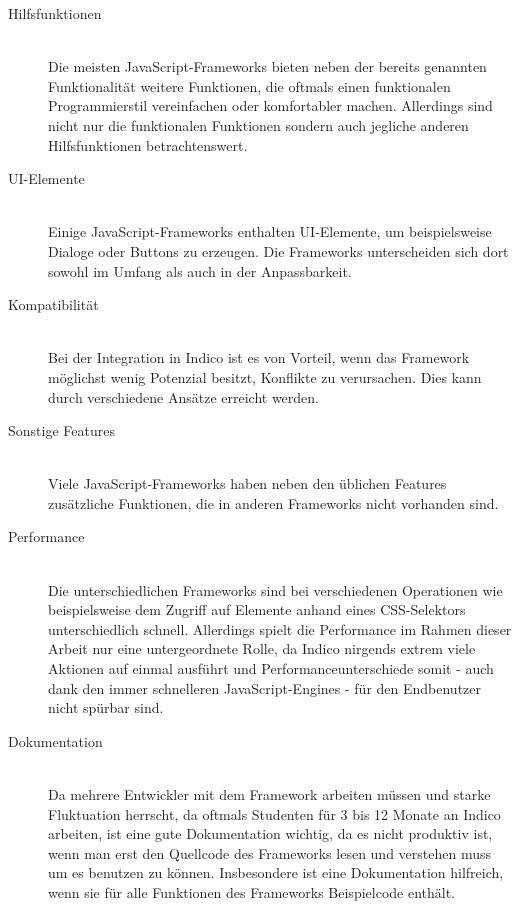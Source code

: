\begin{description}
\item[Hilfsfunktionen] \hfill \\
Die meisten JavaScript-Frameworks bieten neben der bereits genannten Funktionalität weitere
Funktionen, die oftmals einen funktionalen Programmierstil vereinfachen oder komfortabler machen.
Allerdings sind nicht nur die funktionalen Funktionen sondern auch jegliche anderen Hilfsfunktionen
betrachtenswert.

\item[UI-Elemente] \hfill \\
Einige JavaScript-Frameworks enthalten UI-Elemente, um beispielsweise Dialoge oder Buttons zu
erzeugen. Die Frameworks unterscheiden sich dort sowohl im Umfang als auch in der Anpassbarkeit.

\item[Kompatibilität] \hfill \\
Bei der Integration in Indico ist es von Vorteil, wenn das Framework möglichst wenig Potenzial
besitzt, Konflikte zu verursachen. Dies kann durch verschiedene Ansätze erreicht werden.

\item[Sonstige Features] \hfill \\
Viele JavaScript-Frameworks haben neben den üblichen Features zusätzliche Funktionen, die in anderen
Frameworks nicht vorhanden sind.

\item[Performance] \hfill \\
Die unterschiedlichen Frameworks sind bei verschiedenen Operationen wie beispielsweise dem Zugriff
auf Elemente anhand eines CSS-Selektors unterschiedlich schnell. Allerdings spielt die Performance
im Rahmen dieser Arbeit nur eine untergeordnete Rolle, da Indico nirgends extrem viele Aktionen auf
einmal ausführt und Performanceunterschiede somit - auch dank den immer schnelleren
JavaScript-Engines - für den Endbenutzer nicht spürbar sind.

\item[Dokumentation] \hfill \\
Da mehrere Entwickler mit dem Framework arbeiten müssen und starke Fluktuation herrscht, da oftmals
Studenten für 3 bis 12 Monate an Indico arbeiten, ist eine gute Dokumentation wichtig, da es nicht
produktiv ist, wenn man erst den Quellcode des Frameworks lesen und verstehen muss um es benutzen zu
können. Insbesondere ist eine Dokumentation hilfreich, wenn sie für alle Funktionen des Frameworks
Beispielcode enthält.


\end{description}
